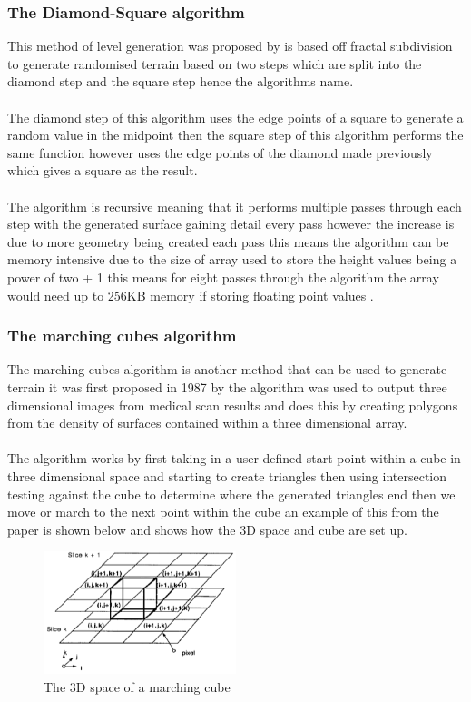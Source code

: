 \subsubsection{The Diamond-Square algorithm}
This method of level generation was proposed by \cite{DSA2} is based off fractal subdivision to generate randomised terrain based on two steps which are split into the diamond step  and the square step hence the algorithms name.\\\\ The diamond step of this algorithm uses the edge points of a square to generate a random value in the midpoint then the square step of this algorithm performs the same function however uses the edge points of the diamond made previously which gives a square as the result. \\\\The algorithm is recursive meaning that it performs multiple passes through each step with the generated surface gaining detail every pass however the increase is due to more geometry being created each pass this means the algorithm can be memory intensive due to the size of array used to store the height values being a power of two + 1 this means for eight passes through the algorithm the array would need up to 256KB memory if storing floating point values \cite{LevelDSA}.

\subsubsection{The marching cubes algorithm}
The marching cubes algorithm is another method that can be used to generate terrain it was first proposed in 1987 by \cite{marching} the algorithm was used to output three dimensional images from medical scan results and does this by creating polygons from the density of surfaces contained within a three dimensional array.\\\\The algorithm works by first taking in a user defined start point within a cube in three dimensional space and starting to create triangles then using intersection testing against the cube to determine where the generated triangles end then we move or march to the next point within the cube an example of this from the paper \cite{marching} is shown below and shows how the 3D space and cube are set up.     

\begin{figure}[ht!]
	\includegraphics[width=0.5\textwidth]{images/Marchingcubes}
	\caption{The 3D space of a marching cube}	 \label{cube}
\end{figure}

